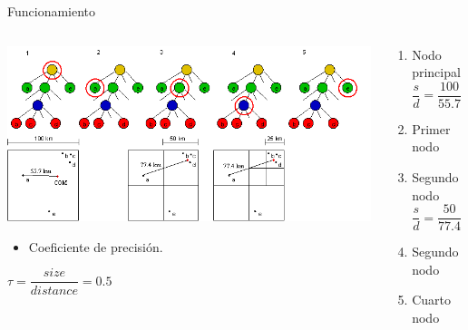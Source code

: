 \documentclass{beamer}
\begin{document}
\begin{frame}{Funcionamiento}
	\begin{columns}
		\begin{column}{0.6\textwidth}
			\centering
			\includegraphics[width=\linewidth]{sources/images/force.png}\\
			\begin{itemize}
				\item Coeficiente de precisi\'on.
			\end{itemize}
			$\tau = \dfrac{size}{distance} = 0.5$
			\pause
		\vspace{1cm}
		
		\end{column}
		\begin{column}{0.4\textwidth}
			\begin{enumerate}
				\footnotesize
				\item {\color{orange} Nodo principal} \pause
				\begin{equation*}
					\dfrac{s}{d} = \dfrac{100}{55.7} \approx 1.8 > \tau 
				\end{equation*}
				\pause
				\item {\color{green} Primer nodo} \pause
				\item {\color{green} Segundo nodo} \pause
				\begin{equation*}
					\dfrac{s}{d} = \dfrac{50}{77.4} \approx 0.6 > \tau
				\end{equation*}
				\pause
				\item {\color{blue} Segundo nodo} \pause
				\pause
				\item {\color{green} Cuarto nodo} \pause
			\end{enumerate}
		\end{column}
	\end{columns}
\end{frame}
\end{document}
